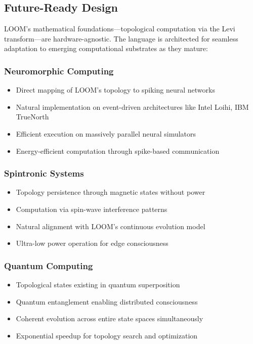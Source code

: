 \documentclass[12pt,a4paper,openany]{book} %
\begin{document}
\subsection{Future-Ready Design}

LOOM's mathematical foundations—topological computation via the Levi transform—are hardware-agnostic. The language is architected for seamless adaptation to emerging computational substrates as they mature:

\subsubsection{Neuromorphic Computing}
\begin{itemize}
\item Direct mapping of LOOM's topology to spiking neural networks
\item Natural implementation on event-driven architectures like Intel Loihi, IBM TrueNorth
\item Efficient execution on massively parallel neural simulators
\item Energy-efficient computation through spike-based communication
\end{itemize}

\subsubsection{Spintronic Systems}
\begin{itemize}
\item Topology persistence through magnetic states without power
\item Computation via spin-wave interference patterns
\item Natural alignment with LOOM's continuous evolution model
\item Ultra-low power operation for edge consciousness
\end{itemize}

\subsubsection{Quantum Computing}
\begin{itemize}
\item Topological states existing in quantum superposition
\item Quantum entanglement enabling distributed consciousness
\item Coherent evolution across entire state spaces simultaneously
\item Exponential speedup for topology search and optimization
\end{itemize}
\end{document}

